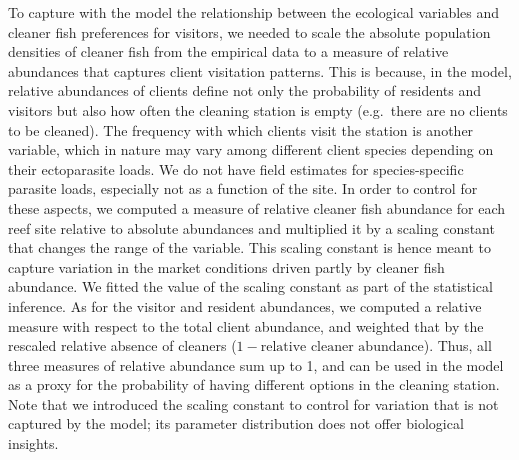 \documentclass[10pt,letterpaper]{article}
\begin{document}
To capture with the model the relationship between the ecological
variables and cleaner fish preferences for visitors, we needed to scale
the absolute population densities of cleaner fish from the empirical
data to a measure of relative abundances that captures client visitation
patterns. This is because, in the model, relative abundances of clients
define not only the probability of residents and visitors but also how
often the cleaning station is empty (e.g.~there are no clients to be
cleaned). The frequency with which clients visit the station is another
variable, which in nature may vary among different client species
depending on their ectoparasite loads. We do not have field estimates
for species-specific parasite loads, especially not as a function of the
site. In order to control for these aspects, we computed a measure of
relative cleaner fish abundance for each reef site relative to absolute
abundances and multiplied it by a scaling constant that changes the
range of the variable. This scaling constant is hence meant to capture
variation in the market conditions driven partly by cleaner fish
abundance. We fitted the value of the scaling constant as part of the
statistical inference. As for the visitor and resident abundances, we
computed a relative measure with respect to the total client abundance,
and weighted that by the rescaled relative absence of cleaners
(\(1-\text{relative cleaner abundance}\)). Thus, all three measures of
relative abundance sum up to 1, and can be used in the model as a proxy
for the probability of having different options in the cleaning station.
Note that we introduced the scaling constant to control for variation
that is not captured by the model; its parameter distribution does not
offer biological insights.
\end{document}
